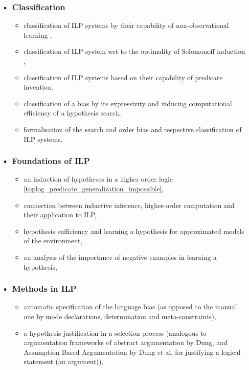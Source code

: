 \begin{itemize}
\item \subsubsection{Classification}
\begin{itemize}
\item classification of ILP systems by their capability of non-observational learning \cite{kimber2012learning},
\item classification of ILP system wrt to the optimality of Solomonoff induction \cite{solomonoff1964formal},
\item classification of ILP systems based on their capability of predicate invention,
\item classification of a bias by its expressivity and inducing computational efficiency of a hypothesis search,
\item formalisation of the search and order bias and respective classification of ILP systems,
\end{itemize}
\item \subsubsection{Foundations of ILP}
\begin{itemize}
\item an induction of hypotheses in a higher order logic \ref{toplog_predicate_generalization_impossible},
\item connection between inductive inference, higher-order computation \cite{longley2000notions} and their application to ILP,
\item hypothesis sufficiency and learning a hypothesis for approximated models of the environment,
\item an analysis of the importance of negative examples in learning a hypothesis,
\end{itemize}
\item \subsubsection{Methods in ILP}
\begin{itemize}
\item automatic specification of the language bias (as opposed to the manual one by mode declarations, determination and meta-constraints),
\item a hypothesis justification in a selection process (analogous to argumentation frameworks of abstract argumentation by Dung\cite{dung1995acceptability}, and Assumption Based Argumentation by Dung et al.\cite{dung2009assumption} for justifying a logical statement (an argument)),
\end{itemize}
\end{itemize}
